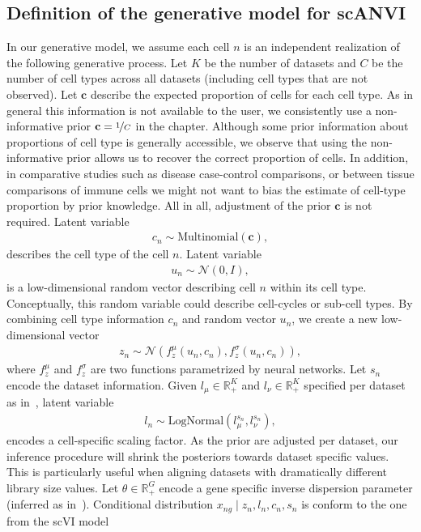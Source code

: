 \subsection{Definition of the generative model for scANVI}

In our generative model, we assume each cell $n$ is an independent realization of the following generative process. Let $K$ be the number of datasets and $C$ be the number of cell types across all datasets (including cell types that are not observed). Let $\mathbf{c}$ describe the expected proportion of cells for each cell type. As in general this information is not available to the user, we consistently use a non-informative prior $\mathbf{c} = \nicefrac{1}{C}$ in the chapter. Although some prior information about proportions of cell type is generally accessible, we observe that using the non-informative prior allows us to recover the correct proportion of cells. In addition, in comparative studies such as disease case-control comparisons, or between tissue comparisons of immune cells \cite{schafflick2019ms} we might not want to bias the estimate of cell-type proportion by prior knowledge. All in all, adjustment of the prior $\mathbf{c}$ is not required.  Latent variable 
\begin{align}
c_n \sim  \mathrm{Multinomial}(\mathbf{c}),
\end{align}
describes the cell type of the cell $n$. Latent variable  
\begin{align}
    u_n \sim \mathcal N(0, I),
\end{align}
is a low-dimensional random vector describing cell $n$ within its cell type. Conceptually, this random variable could describe cell-cycles or sub-cell types. By combining cell type information $c_n$ and random vector $u_n$, we create a new low-dimensional vector
\begin{align}
    z_n  \sim \mathcal{N}(f^{\mu}_{z} (u_n, c_n), f^{\sigma}_{z} (u_n, c_n)),
\end{align}
where $f^{\mu}_{z}$ and $f^{\sigma}_{z}$ are two functions parametrized by neural networks. Let $s_n$ encode the dataset information. Given $l_\mu \in \mathbb{R}_+^K$ and $l_\nu \in \mathbb{R}_+^K$ specified per dataset as in~\cite{scvi}, latent variable
\begin{align}
    l_n \sim \textrm{LogNormal}(l^{s_n}_\mu, l^{s_n}_\nu),
\end{align} 
encodes a cell-specific scaling factor. As the prior are adjusted per dataset, our inference procedure will shrink the posteriors towards dataset specific values. This is particularly useful when aligning datasets with dramatically different library size values. Let $\theta \in \mathbb{R}_+^G$ encode a gene specific inverse dispersion parameter (inferred as in~\cite{scvi}). Conditional distribution $x_{ng} \mid z_n, l_n, c_n, s_n$ is conform to the one from the scVI model
